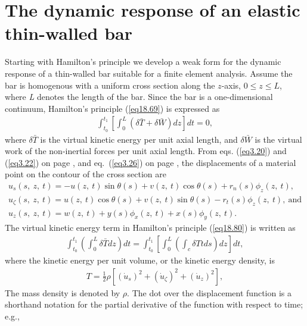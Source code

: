 \documentclass{AeroStructure-ERJohnson}
\begin{document}
\vspace*{-1.4pc}

\setcounter{equation}{79}
\section{The dynamic response of an elastic thin-walled bar}\label{sec18.6}

Starting with Hamilton's principle we develop a weak form for the dynamic response of a thin-walled bar suitable for a finite element analysis. Assume the bar is homogenous with a uniform cross section along the $z$-axis, $0 \leq z \leq L$, where \textit{L} denotes the length of the bar. Since the bar is a one-dimensional continuum, Hamilton's principle (\ref{eq18.69}) is expressed as
\begin{align}\label{eq18.80}
\int_{t_{0}}^{t_{1}}\left[\int_{0}^{L}(\delta \bar{T}+\delta \bar{W}) d z\right] d t=0,
\end{align}
where $\delta \bar{T}$ is the virtual kinetic energy per unit axial length, and $\delta \bar{W}$ is the virtual work of the non-inertial forces per unit axial length. From eqs. (\ref{eq3.20}) and (\ref{eq3.22}) on page \pageref{eq3.20}, and eq.~(\ref{eq3.26}) on page \pageref{eq3.26}, the displacements of a material point on the contour of the cross section are
\begin{gather}
\label{eq18.81}
u_{s}(s,~z,~t)=-u(z,~t) \sin \theta(s)+v(z,~t) \cos \theta(s)+r_{n}(s) \phi_{z}(z,~t),
\\
\label{eq18.82}
u_{\zeta}(s,~z,~t)=u(z,~t) \cos \theta(s)+v(z,~t) \sin \theta(s)-r_{t}(s) \phi_{z}(z,~t),\ \text{and}
\\
\label{eq18.83}
u_{z}(s,~z,~t)=w(z,~t)+y(s) \phi_{x}(z,~t)+x(s) \phi_{y}(z,~t).
\end{gather}
The virtual kinetic energy term in Hamilton's principle (\ref{eq18.80}) is written as
\begin{align}\label{eq18.84}
\int_{t_{0}}^{t_{1}}\left(\int_{0}^{L} \delta \bar{T} d z\right) d t=\int_{t_{0}}^{t_{1}}\left[\int_{0}^{L}\left(\int_{c} \delta T t d s\right) d z\right] d t,
\end{align}
where the kinetic energy per unit volume, or the kinetic energy density, is
\begin{align}\label{eq18.85}
T=\frac{1}{2} \rho\left[\left(\dot{u}_{s}\right)^{2}+\left(\dot{u}_{\zeta}\right)^{2}+\left(\dot{u}_{z}\right)^{2}\right],
\end{align}
The mass density is denoted by $\rho$. The dot over the displacement function is a shorthand notation for the partial derivative of the function with respect to time; e.g.,
\end{document}
